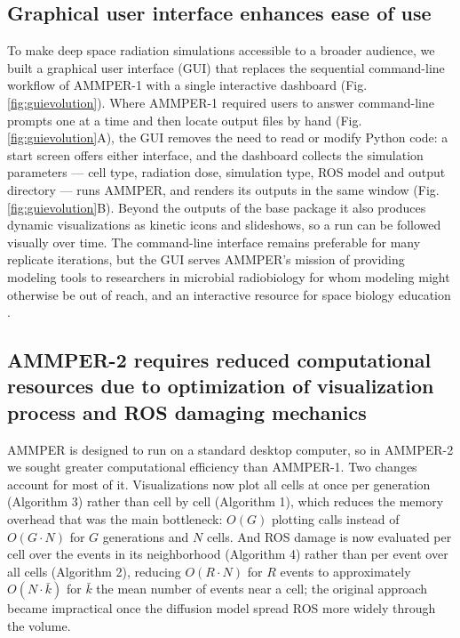 \documentclass{asmarticle}
\begin{document}
\subsection{Graphical user interface enhances ease of use}
To make deep space radiation simulations accessible to a broader audience, we built a graphical user interface (GUI) that replaces the sequential command-line workflow of AMMPER-1 with a single interactive dashboard (Fig. \ref{fig:guievolution}). Where AMMPER-1 required users to answer command-line prompts one at a time and then locate output files by hand (Fig. \ref{fig:guievolution}A), the GUI removes the need to read or modify Python code: a start screen offers either interface, and the dashboard collects the simulation parameters --- cell type, radiation dose, simulation type, ROS model and output directory --- runs AMMPER, and renders its outputs in the same window (Fig. \ref{fig:guievolution}B). Beyond the outputs of the base package it also produces dynamic visualizations as kinetic icons and slideshows, so a run can be followed visually over time. The command-line interface remains preferable for many replicate iterations, but the GUI serves AMMPER's mission of providing modeling tools to researchers in microbial radiobiology for whom modeling might otherwise be out of reach, and an interactive resource for space biology education \cite{vallerio2006energy, miranda2011importance, marcus1995principles, harrison2011kineticons}.

\subsection{AMMPER-2 requires reduced computational resources due to optimization of visualization process and ROS damaging mechanics}
AMMPER is designed to run on a standard desktop computer, so in AMMPER-2 we sought greater computational efficiency than AMMPER-1. Two changes account for most of it. Visualizations now plot all cells at once per generation (Algorithm 3) rather than cell by cell (Algorithm 1), which reduces the memory overhead that was the main bottleneck: $O(G)$ plotting calls instead of $O(G \cdot N)$ for $G$ generations and $N$ cells. And ROS damage is now evaluated per cell over the events in its neighborhood (Algorithm 4) rather than per event over all cells (Algorithm 2), reducing $O(R \cdot N)$ for $R$ events to approximately $O(N \cdot \bar{k})$ for $\bar{k}$ the mean number of events near a cell; the original approach became impractical once the diffusion model spread ROS more widely through the volume.
\end{document}
